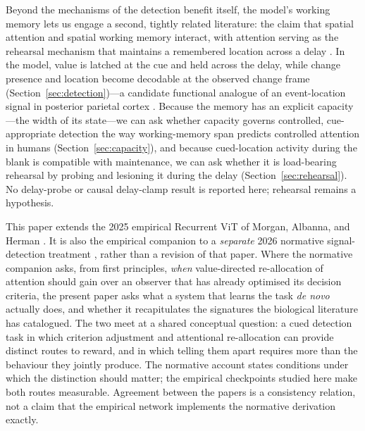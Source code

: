 Beyond the mechanisms of the detection benefit itself, the model's
working memory lets us engage a second, tightly related literature: the claim
that spatial attention and spatial working memory interact, with attention
serving as the rehearsal mechanism that maintains a remembered location across a
delay \cite{awh_jonides2001_overlapping_attention_wm, awh1998_rehearsal,
kane2001_controlled_attention}. In the model, value is latched at the cue and held across the delay, while change
presence and location become decodable at the observed change frame
(Section~\ref{sec:detection})---a candidate functional analogue of an event-location
signal in posterior parietal cortex
\cite{bisley_goldberg2010}. Because the memory has an
explicit capacity---the width of its state---we can ask whether capacity governs
controlled, cue-appropriate detection the way working-memory span predicts
controlled attention in humans (Section~\ref{sec:capacity}), and because cued-location activity during the blank is compatible with maintenance, we can ask
whether it is load-bearing rehearsal by probing and lesioning it during the delay
(Section~\ref{sec:rehearsal}). No delay-probe or causal delay-clamp result is reported
here; rehearsal remains a hypothesis.

This paper extends the 2025 empirical Recurrent ViT of Morgan, Albanna, and Herman
\cite{morgan_albanna_herman2025_rvit}. It is also the empirical companion to a
\emph{separate} 2026 normative signal-detection treatment
\cite{morgan_albanna_herman2026_vda}, rather than a revision of that paper. Where the
normative companion asks, from first principles, \emph{when} value-directed
re-allocation of attention should gain over an observer that has already
optimised its decision criteria, the present paper asks what a system that
learns the task \emph{de novo} actually does, and whether it recapitulates the
signatures the biological literature has catalogued. The two meet at a shared conceptual question: a cued detection task in which
criterion adjustment and attentional re-allocation can provide distinct routes to
reward, and in which telling them apart requires more than the behaviour they jointly
produce. The normative account states conditions under which the distinction should
matter; the empirical checkpoints studied here make both routes measurable. Agreement
between the papers is a consistency relation, not a claim that the empirical network
implements the normative derivation exactly.

